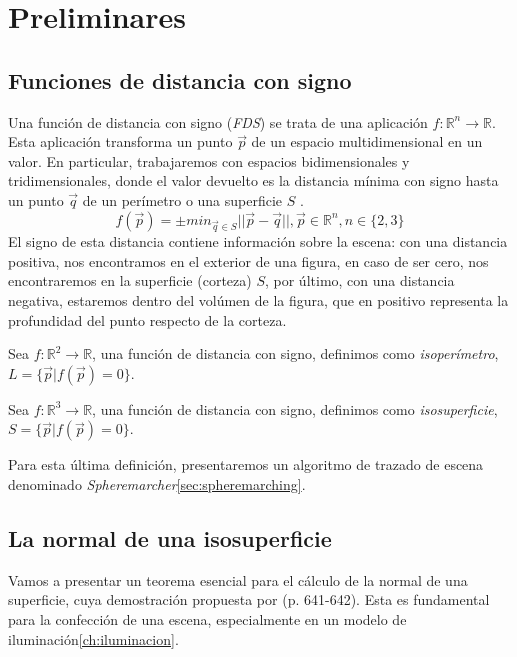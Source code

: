 \chapter{Preliminares}


\section{Funciones de distancia con signo\label{sec:fds}}

Una función de distancia con signo (\textit{FDS}) se trata de una aplicación \(f: \mathbb{R}^n\longrightarrow \mathbb{R}\). Esta aplicación transforma un punto \(\Vec{p}\) de un espacio multidimensional en un valor. En particular, trabajaremos con espacios bidimensionales y tridimensionales, donde el valor devuelto es la distancia mínima con signo hasta un punto \(\Vec{q}\) de un perímetro o una superficie \(S\)  \cite{hart1996sphere}. 
\[f(\Vec{p})=\pm min_{\Vec{q}\in S}\vert\vert \Vec{p}-\Vec{q} \vert\vert , \Vec{p} \in \mathbb{R}^n, n\in \{2,3\}\]
El signo de esta distancia contiene información sobre la escena: con una distancia positiva, nos encontramos en el exterior de una figura, en caso de ser cero, nos encontraremos en la superficie (corteza) \(S\), por último, con una distancia negativa, estaremos dentro del volúmen de la figura, que en positivo representa la profundidad del punto respecto de la corteza. 

\begin{definition}
	Sea \(f:\mathbb{R}^2\longrightarrow\mathbb{R}\), una función de distancia con signo, definimos como \textit{isoperímetro}, \(L=\{\Vec{p} \vert f(\Vec{p})=0\}\).
\end{definition}

\begin{definition}
	Sea \(f:\mathbb{R}^3\longrightarrow\mathbb{R}\), una función de distancia con signo, definimos como \textit{isosuperficie}, \(S=\{\Vec{p} \vert f(\Vec{p})=0\}\).
\end{definition}

Para esta última definición, presentaremos un algoritmo de trazado de escena denominado \textit{Spheremarcher}\ref{sec:spheremarching}.
\newpage
\section{La normal de una isosuperficie \label{sec:normal}}

Vamos a presentar un teorema esencial para el cálculo de la normal de una superficie, cuya demostración propuesta por  \cite{goldman2005curvature} (p. 641-642). Esta es fundamental para la confección de una escena, especialmente en un modelo de iluminación\ref{ch:iluminacion}.

